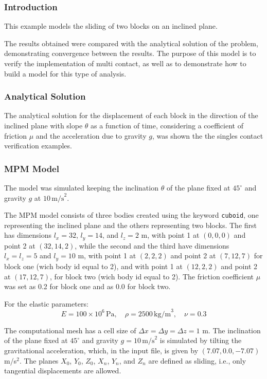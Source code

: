 \subsubsection*{Introduction}

This example models the sliding of two blocks on an inclined plane.  

The results obtained were compared with the analytical solution of the problem, demonstrating convergence between the results.  
The purpose of this model is to verify the implementation of multi contact, as well as to demonstrate how to build a model for this type of analysis.

\subsubsection*{Analytical Solution}

The analytical solution for the displacement of each block in the direction of the inclined plane with slope $\theta$ as a function of time, considering a coefficient of friction $\mu$ and the acceleration due to gravity $g$, was shown the the singles contact verification examples.

\subsubsection*{MPM Model}

The model was simulated keeping the inclination $\theta$ of the plane fixed at $45^{\circ}$ and gravity $g$ at $10 \, \text{m/s}^2$.  

The MPM model consists of three bodies created using the keyword \texttt{cuboid}, one representing the inclined plane and the others representing two blocks. 
The first has dimensions $l_x = 32$, $l_y = 14$, and $l_z = 2$ m, with point 1 at $(0,0,0)$ and point 2 at $(32, 14, 2)$, 
while the second and the third have dimensions $l_x = l_z = 5$ and $l_y = 10$ m, with point 1 at $(2,2,2)$ and point 2 at $(7, 12, 7)$ for block one (wich body id equal to 2),
and with point 1 at $(12,2,2)$ and point 2 at $(17, 12, 7)$, for block two (wich body id equal to 2). The friction coefficient $\mu$ was set as 0.2 for block one and as 0.0 for block two.

For the elastic parameters:
\[
E = 100 \times 10^6\,\text{Pa}, \quad \rho = 2500\,\text{kg/m}^3, \quad \nu = 0.3
\]

The computational mesh has a cell size of $\Delta x = \Delta y = \Delta z = 1$ m. The inclination of the plane fixed at $45^{\circ}$ and gravity $g =10 \, \text{m/s}^2$ is simulated 
by tilting the gravitational acceleration, which, in the input file, is given by $(7.07, 0.0, -7.07)$ m/s$^2$. 
The planes $X_0$, $Y_0$, $Z_0$, $X_n$, $Y_n$, and $Z_n$ are defined as sliding, i.e., only tangential displacements are allowed.

